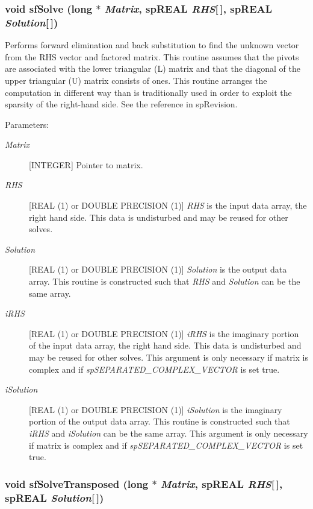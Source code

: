\subsubsection{\setlength{\rightskip}{0pt plus 5cm}void sf\-Solve (long $\ast$ {\em Matrix}, sp\-REAL {\em RHS}[$\,$], sp\-REAL {\em Solution}[$\,$])}\label{spFortran_8c_a64}


Performs forward elimination and back substitution to find the unknown vector from the RHS vector and factored matrix. This routine assumes that the pivots are associated with the lower triangular (L) matrix and that the diagonal of the upper triangular (U) matrix consists of ones. This routine arranges the computation in different way than is traditionally used in order to exploit the sparsity of the right-hand side. See the reference in sp\-Revision.\begin{Desc}
\item[Parameters: ]\par
\begin{description}
\item[{\em 
Matrix}][INTEGER] Pointer to matrix. \item[{\em 
RHS}][REAL (1) or DOUBLE PRECISION (1)] {\em RHS} is the input data array, the right hand side. This data is undisturbed and may be reused for other solves. \item[{\em 
Solution}][REAL (1) or DOUBLE PRECISION (1)] {\em Solution} is the output data array. This routine is constructed such that {\em RHS} and {\em Solution} can be the same array. \item[{\em 
i\-RHS}][REAL (1) or DOUBLE PRECISION (1)] {\em i\-RHS} is the imaginary portion of the input data array, the right hand side. This data is undisturbed and may be reused for other solves. This argument is only necessary if matrix is complex and if {\em sp\-SEPARATED\_\-COMPLEX\_\-VECTOR} is set true. \item[{\em 
i\-Solution}][REAL (1) or DOUBLE PRECISION (1)] {\em i\-Solution} is the imaginary portion of the output data array. This routine is constructed such that {\em i\-RHS} and {\em i\-Solution} can be the same array. This argument is only necessary if matrix is complex and if {\em sp\-SEPARATED\_\-COMPLEX\_\-VECTOR} is set true. \end{description}
\end{Desc}
\subsubsection{\setlength{\rightskip}{0pt plus 5cm}void sf\-Solve\-Transposed (long $\ast$ {\em Matrix}, sp\-REAL {\em RHS}[$\,$], sp\-REAL {\em Solution}[$\,$])}\label{spFortran_8c_a65}


